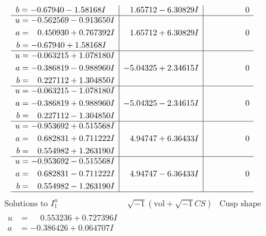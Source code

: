 \documentclass[1p]{elsarticle_modified}
\theoremstyle{definition}
\newcommand{\I}{\sqrt{-1}}
\begin{document}
$$\begin{array}{c|c|c}
\begin{aligned}
b &= -0.67940 - 1.58168 I\end{aligned}
 & \phantom{-}1.65712 - 6.30829 I & \phantom{-0.000000 } 0 \\ \hline\begin{aligned}
u &= -0.562569 - 0.913650 I \\
a &= \phantom{-}0.450930 + 0.767392 I \\
b &= -0.67940 + 1.58168 I\end{aligned}
 & \phantom{-}1.65712 + 6.30829 I & \phantom{-0.000000 } 0 \\ \hline\begin{aligned}
u &= -0.063215 + 1.078180 I \\
a &= -0.386819 - 0.988960 I \\
b &= \phantom{-}0.227112 + 1.304850 I\end{aligned}
 & -5.04325 + 2.34615 I & \phantom{-0.000000 } 0 \\ \hline\begin{aligned}
u &= -0.063215 - 1.078180 I \\
a &= -0.386819 + 0.988960 I \\
b &= \phantom{-}0.227112 - 1.304850 I\end{aligned}
 & -5.04325 - 2.34615 I & \phantom{-0.000000 } 0 \\ \hline\begin{aligned}
u &= -0.953692 + 0.515568 I \\
a &= \phantom{-}0.682831 + 0.711222 I \\
b &= \phantom{-}0.554982 + 1.263190 I\end{aligned}
 & \phantom{-}4.94747 + 6.36433 I & \phantom{-0.000000 } 0 \\ \hline\begin{aligned}
u &= -0.953692 - 0.515568 I \\
a &= \phantom{-}0.682831 - 0.711222 I \\
b &= \phantom{-}0.554982 - 1.263190 I\end{aligned}
 & \phantom{-}4.94747 - 6.36433 I & \phantom{-0.000000 } 0\\
 \hline 
 \end{array}$$\newpage$$\begin{array}{c|c|c}  
\text{Solutions to }I^u_{1}& \I (\text{vol} + \sqrt{-1}CS) & \text{Cusp shape}\\
 \hline 
\begin{aligned}
u &= \phantom{-}0.553236 + 0.727396 I \\
a &= -0.386426 + 0.064707 I \\

\end{aligned}
\end{array}$$
\end{document}
